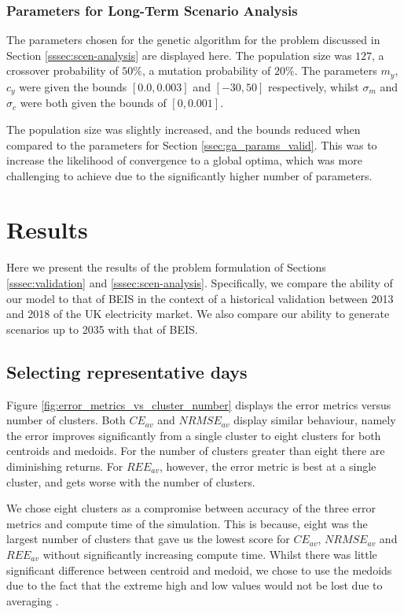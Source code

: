 \subsubsection{Parameters for Long-Term Scenario Analysis}

The parameters chosen for the genetic algorithm for the problem discussed in Section \ref{sssec:scen-analysis} are displayed here. The population size was $127$, a crossover probability of $50\%$, a mutation probability of $20\%$. The parameters $m_y$, $c_y$ were given the bounds $[0.0, 0.003]$ and $[-30, 50]$ respectively, whilst $\sigma_m$ and $\sigma_c$ were both given the bounds of $[0, 0.001]$.

The population size was slightly increased, and the bounds reduced when compared to the parameters for Section \ref{ssec:ga_params_valid}. This was to increase the likelihood of convergence to a global optima, which was more challenging to achieve due to the significantly higher number of parameters.


\section{Results}
\label{sec:results}

Here we present the results of the problem formulation of Sections \ref{sssec:validation} and  \ref{sssec:scen-analysis}. Specifically, we compare the ability of our model to that of BEIS in the context of a historical validation between 2013 and 2018 of the UK electricity market. We also compare our ability to generate scenarios up to 2035 with that of BEIS. 

\subsection{Selecting representative days}
\label{ssec:res_repr_days}

Figure \ref{fig:error_metrics_vs_cluster_number} displays the error metrics versus number of clusters. Both $CE_{av}$ and $NRMSE_{av}$ display similar behaviour, namely the error improves significantly from a single cluster to eight clusters for both centroids and medoids. For the number of clusters greater than eight there are diminishing returns. For $REE_{av}$, however, the error metric is best at a single cluster, and gets worse with the number of clusters. 



We chose eight clusters as a compromise between accuracy of the three error metrics and compute time of the simulation. This is because, eight was the largest number of clusters that gave us the lowest score for $CE_{av}$, $NRMSE_{av}$ and $REE_{av}$ without significantly increasing compute time. Whilst there was little significant difference between centroid and medoid, we chose to use the medoids due to the fact that the extreme high and low values would not be lost due to averaging \cite{Hilbers2019}.





